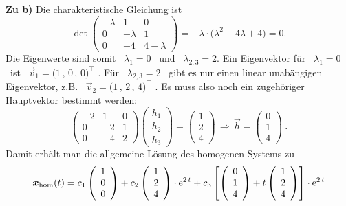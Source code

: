 {\bigskip
\textbf{Zu b)} Die charakteristische Gleichung ist
\[
\det \left(\begin{array}{ccc} -\lambda & 1 & 0 \\ 0 & -\lambda & 1 \\ 0 & -4 & 4-\lambda \end{array}\right) = -\lambda\cdot\big(\lambda^2 -4\lambda+4\big) = 0 .
\]
Die Eigenwerte sind somit \ $\lambda_1=0 $ \ und \ $ \lambda_{2,3}=2$. Ein Eigenvektor f\"ur \ $\lambda_1=0$ \ ist \ $\vec v_1=\big(1\,,\,0\,,\,0\big)^{\top}$ . F\"ur \ $\lambda_{2,3}=2$ \ gibt es nur einen linear unab\"angigen Eigenvektor, z.B. \ $\vec v_2=\big(1\,,\,2\,,\,4\big)^{\top}$ . Es muss also noch ein zugeh\"origer Hauptvektor bestimmt werden: 
\[
\left(\begin{array}{ccc} -2 & 1 & 0 \\ 0 & -2 & 1 \\ 0 & -4 & 2 \end{array}\right)	\left(\begin{array}{c} h_1 \\ h_2 \\ h_3 \end{array}\right) = \left(\begin{array}{c} 1 \\ 2 \\ 4 \end{array}\right) \,\Rightarrow\,  \vec h = \left(\begin{array}{c} 0 \\ 1 \\ 4 \end{array}\right)\ .
\]
Damit erh\"alt man die allgemeine L\"osung des homogenen Systems zu
\[
	\boldsymbol x_{\mathrm{hom}} (t) = c_1\left(\begin{array}{c} 1 \\ 0 \\ 0 \end{array}\right) + c_2\left(\begin{array}{c} 1 \\ 2 \\ 4 \end{array}\right)\cdot\mathrm{e}^{2\,t} + c_3\left[\left(\begin{array}{c} 0 \\ 1 \\ 4 \end{array}\right)+t\left(\begin{array}{c} 1 \\ 2 \\ 4 \end{array}\right)\right]\cdot\mathrm{e}^{2\,t}
\]


}
